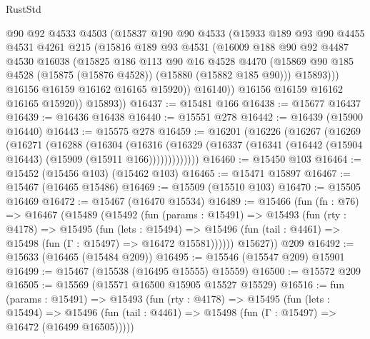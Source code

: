\begin{lexlean}{RustStd}
\begin{coremodule}
                @90
                @92
                @4533
                @4503
                (@15837
                  @190
                  @90
                  @4533
                  (@15933
                    @189
                    @93
                    @90
                    @4455
                    @4531
                    @4261
                    @215
                    (@15816
                      @189
                      @93
                      @4531
                      (@16009
                        @188
                        @90
                        @92
                        @4487
                        @4530
                        @16038
                        (@15825
                          @186
                          @113
                          @90
                          @16
                          @4528
                          @4470
                          (@15869 @90 @185 @4528 (@15875 (@15876 @4528)) (@15880 (@15882 @185 @90)))
                          @15893)))
                    @16156
                    @16159
                    @16162
                    @16165
                    @15920))
                @16140))
            @16156
            @16159
            @16162
            @16165
            @15920))
        @15893))
@16437 := @15481 @166
@16438 := @15677 @16437
@16439 := @16436 @16438
@16440 := @15551 @278
@16442 := @16439 (@15900 @16440)
@16443 := @15575 @278
@16459 := @16201
    (@16226
      (@16267
        (@16269
          (@16271
            (@16288
              (@16304
                (@16316
                  (@16329 (@16337 (@16341 (@16442 (@15904 @16443) (@15909 (@15911 @166)))))))))))))
@16460 := @15450 @103
@16464 := @15452 (@15456 @103) (@15462 @103)
@16465 := @15471 @15897
@16467 := @15467 (@16465 @15486)
@16469 := @15509 (@15510 @103)
@16470 := @15505 @16469
@16472 := @15467 (@16470 @15534)
@16489 := @15466
    (fun (fn : @76) =>
    @16467
      (@15489
        (@15492
          (fun (params : @15491) =>
          @15493
            (fun (rty : @4178) =>
            @15495
              (fun (lets : @15494) =>
              @15496 (fun (tail : @4461) => @15498 (fun (Γ : @15497) => @16472 @15581))))))
        @15627))
    @209
@16492 := @15633 (@16465 (@15484 @209))
@16495 := @15546 (@15547 @209) @15901
@16499 := @15467 (@15538 (@16495 @15555) @15559)
@16500 := @15572 @209
@16505 := @15569 (@15571 @16500 @15905 @15527 @15529)
@16516 := fun (params : @15491) =>
  @15493
    (fun (rty : @4178) =>
    @15495
      (fun (lets : @15494) =>
      @15496 (fun (tail : @4461) => @15498 (fun (Γ : @15497) => @16472 (@16499 @16505)))))

\end{coremodule}
\end{lexlean}
